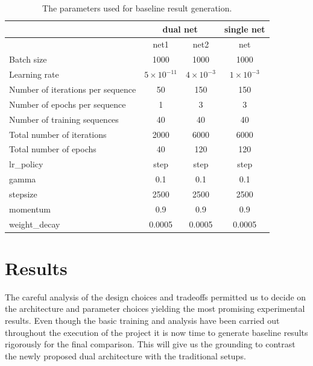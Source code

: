\documentclass[a4paper, 12pt]{article}
\numberwithin{equation}{section}
\begin{document}
	\begin{table}[ht!]
		\centering
		\caption{The parameters used for baseline result generation.}
		\label{tab:parameters}
		\begin{tabular}{|l|c|c|c|}
			\hline
			& \multicolumn{2}{c|}{dual net} & single net \\ \hline
			& net1          & net2          & net        \\ \hline
			Batch size                        & 1000          & 1000          & 1000       \\ \hline
			Learning rate                     & $5\times10^{-11}$             & $4\times10^{-3}$             & $1\times10^{-3}$         \\ \hline
			Number of iterations per sequence & 50            & 150           & 150        \\ \hline
			Number of epochs per sequence     & 1             & 3             & 3          \\ \hline
			Number of training sequences      & 40            & 40            & 40         \\ \hline
			Total number of iterations        & 2000          & 6000          & 6000       \\ \hline
			Total number of epochs            & 40            & 120           & 120        \\ \hline
			lr\_policy                        & step          & step          & step       \\ \hline
			gamma                             & 0.1           & 0.1           & 0.1        \\ \hline
			stepsize                          & 2500          & 2500          & 2500       \\ \hline
			momentum                          & 0.9           & 0.9           & 0.9        \\ \hline
			weight\_decay                     & 0.0005        & 0.0005        & 0.0005     \\ \hline
		\end{tabular}
	\end{table}

	\section{Results}
	
	The careful analysis of the design choices and tradeoffs permitted us to decide on the architecture and parameter choices yielding the most promising experimental results. Even though the basic training and analysis have been carried out throughout the execution of the project it is now time to generate baseline results rigorously for the final comparison. This will give us the grounding to contrast the newly proposed dual architecture with the traditional setups.
\end{document}
